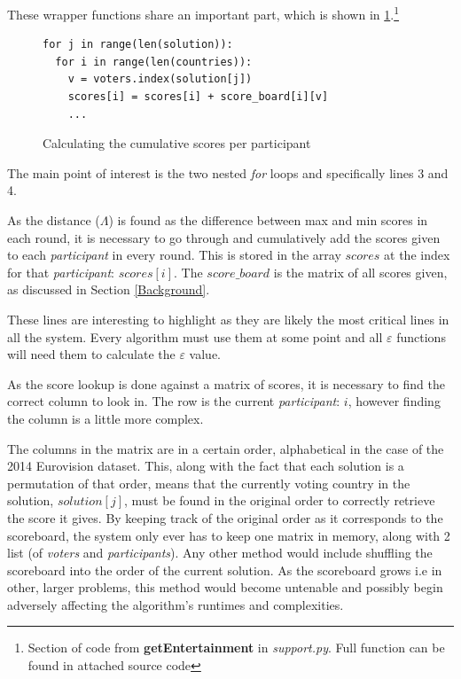 \documentclass[12pt]{report}
\begin{document}
These wrapper functions share an important part, which is shown in \ref{findScores}.\footnote{Section of code from \textbf{getEntertainment} in \textit{support.py}. Full function can be found in attached source code}

\begin{figure}[H]
\caption{Calculating the cumulative scores per participant}
\label{findScores}
\begin{lstlisting}
for j in range(len(solution)):
  for i in range(len(countries)):
    v = voters.index(solution[j])
    scores[i] = scores[i] + score_board[i][v]
    ...
\end{lstlisting}
\end{figure}

The main point of interest is the two nested \textit{for} loops and specifically lines 3 and 4.

As the distance ($\Lambda$) is found as the difference between max and min scores in each round, it is necessary to go through and cumulatively add the scores given to each \textit{participant} in every round. This is stored in the array $scores$ at the index for that \textit{participant}: $scores[i]$. The $score\_board$ is the matrix of all scores given, as discussed in Section \ref{Background}. 

These lines are interesting to highlight as they are likely the most critical lines in all the system. Every algorithm must use them at some point and all $\varepsilon$ functions will need them to calculate the $\varepsilon$ value.

As the score lookup is done against a matrix of scores, it is necessary to find the correct column to look in. The row is the current \textit{participant}: $i$, however finding the column is a little more complex. 

The columns in the matrix are in a certain order, alphabetical in the case of the 2014 Eurovision dataset. This, along with the fact that each solution is a permutation of that order, means that the currently voting country in the solution, $solution[j]$, must be found in the original order to correctly retrieve the score it gives. By keeping track of the original order as it corresponds to the scoreboard, the system only ever has to keep one matrix in memory, along with 2 list (of \textit{voters} and \textit{participants}). Any other method would include shuffling the scoreboard into the order of the current solution. As the scoreboard grows i.e in other, larger problems, this method would become untenable and possibly begin adversely affecting the algorithm's runtimes and complexities.
\end{document}
